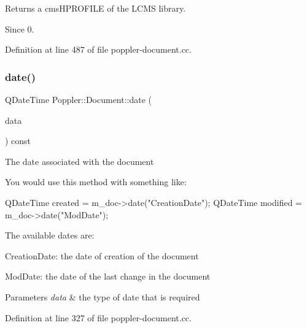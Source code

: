 \begin{DoxyReturn}{Returns}
a {\ttfamily cms\+H\+P\+R\+O\+F\+I\+LE} of the L\+C\+MS library.
\end{DoxyReturn}
\begin{DoxySince}{Since}
0. 
\end{DoxySince}


Definition at line 487 of file poppler-\/document.\+cc.

\mbox{\label{class_poppler_1_1_document_a7e97595aa9634c4bc65d4bdd3ae6314f}} 
\subsubsection{\texorpdfstring{date()}{date()}}
{\footnotesize\ttfamily Q\+Date\+Time Poppler\+::\+Document\+::date (\begin{DoxyParamCaption}\item[{const Q\+String \&}]{data }\end{DoxyParamCaption}) const}

The date associated with the document

You would use this method with something like\+: 
\begin{DoxyCode}
QDateTime created = m\_doc->date(\textcolor{stringliteral}{"CreationDate"});
QDateTime modified = m\_doc->date(\textcolor{stringliteral}{"ModDate"});
\end{DoxyCode}


The available dates are\+:
\begin{DoxyItemize}
\item Creation\+Date\+: the date of creation of the document
\item Mod\+Date\+: the date of the last change in the document
\end{DoxyItemize}


\begin{DoxyParams}{Parameters}
{\em data} & the type of date that is required \\
\hline
\end{DoxyParams}


Definition at line 327 of file poppler-\/document.\+cc.

\mbox{\label{class_poppler_1_1_document_aab2376871d1323457d826747e53a2f00}} 
